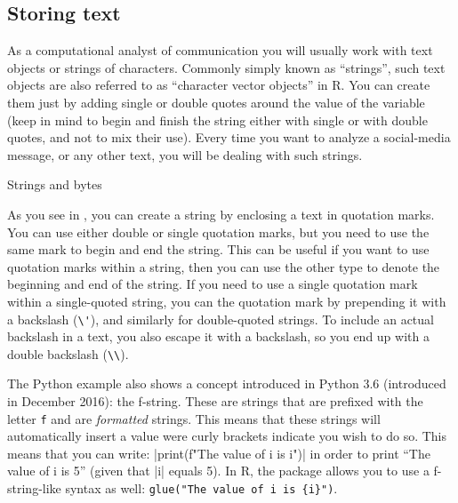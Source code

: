 



\subsection{Storing text}

As a computational analyst of communication you will usually work with
text objects or strings of characters. Commonly simply known as ``strings'',
such text objects are also referred to as ``character vector objects'' in R.
You can create them just by adding single or double quotes around the value of the variable (keep in mind to begin and finish the string either with single or with double quotes, and not to mix their use). Every time you want to analyze a social-media message, or any other text, you will be dealing with such strings. 

\begin{ccsexample}
  \caption{Strings and bytes}\label{ex:var4}
 \end{ccsexample}

As you see in , you can create a string by enclosing a text in quotation
marks. You can use either double or single quotation marks, but you
need to use the same mark to begin and end the string. This can be
useful if you want to use quotation marks within a string, then you can
use the other type to denote the beginning and end of the string.
If you need to use a single quotation mark within a single-quoted string,
you can  the quotation mark by prepending it with a backslash (\verb|\'|),
and similarly for double-quoted strings.
To include an actual backslash in a text, you also escape it with a backslash,
so you end up with a double backslash (\verb|\\|). 

The Python example also shows a concept introduced in Python 3.6 (introduced in December 2016):
the f-string.  These are strings that are prefixed with the letter \texttt{f} and are \emph{formatted} strings. This means that these strings will automatically insert a value were curly brackets indicate you wish to do so. This means that you can write: |print(f"The value of i is {i}")| in order to print ``The value of i is 5'' (given that |i| equals 5).
In R, the  package allows you to use a f-string-like syntax as well: \texttt{glue("The value of i is \{i\}")}.

